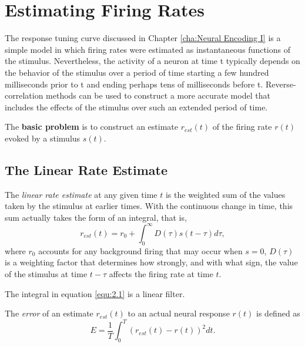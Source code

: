 \section{Estimating Firing Rates}
\label{sec:EstimatingFiringRates}

\begin{rem}
  The response tuning curve discussed in Chapter \ref{cha:Neural Encoding I} is a simple model in which firing rates were estimated as instantaneous functions of the stimulus. Nevertheless, the activity of a neuron at time t typically depends on the behavior of the stimulus over a period of time starting a few hundred milliseconds prior to t and ending perhaps tens of milliseconds before t. Reverse-correlation methods can be used to construct a more accurate model that includes the effects of the stimulus over such an extended period of time.
\end{rem}

\begin{rem}
  The \textbf{basic problem} is to construct an estimate $r_{est}(t)$ of the firing rate $r(t)$ evoked by a stimulus $s(t)$.
\end{rem}

\subsection{The Linear Rate Estimate}

\begin{defn}
  \label{def:linearEstimate}
  The \emph{linear rate estimate} at any given time $t$ is the weighted sum of the values taken by the stimulus at earlier times. With the continuous change in time, this sum actually takes the form of an integral, that is,
  \begin{equation}
    \label{equ:2.1}
    r_{est}(t) = r_0 + \int_0^{\infty}D(\tau) s(t-\tau)d\tau,
  \end{equation}
  where $r_0$ accounts for any background firing that may occur when $s = 0$, $D(\tau)$ is a weighting factor that determines how strongly,  and with what sign, the value of the stimulus at time $t-\tau$ affects the firing rate at time $t$.
\end{defn}

\begin{rem}
  The integral in equation \ref{equ:2.1} is a linear filter.
\end{rem}

\begin{defn}
  \label{def:error}
  The \emph{error} of an estimate $r_{est}(t)$ to an actual neural response $r(t)$ is defined as
  \begin{equation}
    \label{equ:2.3}
    E = \frac{1}{T}\int_0^T(r_{est}(t)-r(t))^2dt.
  \end{equation}
\end{defn}

